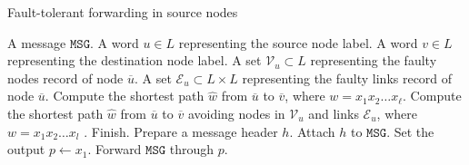 \begin{algorithm}[htbp]
\caption{Fault-tolerant forwarding in source nodes}
\label{al:fwd_src_ft}
\begin{algorithmic}[1]
	\REQUIRE A message $\texttt{MSG}$.
    \REQUIRE A word $u\in L$ representing the source node label.
	\REQUIRE A word $v\in L$ representing the destination node label.
	\REQUIRE A set $\mathcal{V}_u \subset L$ representing the faulty nodes record of node $\overline{u}$.
    \REQUIRE A set $\mathcal{E}_u \subset L\times L$ representing the faulty links record of node $\overline{u}$.
    \STATE Compute the shortest path $\widehat{w}$ from $\overline{u}$ to $\overline{v}$, where $w=x_1x_2\ldots x_\ell$.  
    \ELSE
    \STATE Compute the shortest path $\widehat{w}$ from $\overline{u}$ to $\overline{v}$ avoiding nodes in $\mathcal{V}_u$ and links $\mathcal{E}_u$, where $w=x_1x_2\ldots x_l$ .
    \STATE Finish.
    \ENDIF
    \ENDIF   
    \STATE Prepare a message header $h$. 
    \STATE Attach $h$ to $\texttt{MSG}$.
    \STATE Set the output $p\leftarrow x_1$.
    \STATE Forward $\texttt{MSG}$ through $p$.
\end{algorithmic}
\end{algorithm}
